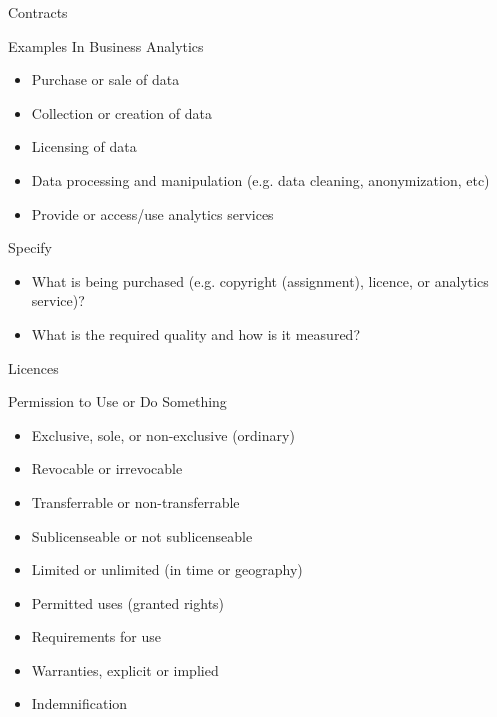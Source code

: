 \documentclass[ignorenonframetext,xcolor=x11names]{beamer}
\begin{document}
\begin{frame}{Contracts}
  \begin{block}{Examples In Business Analytics}
  \begin{itemize}
     \item Purchase or sale of data
     \item Collection or creation of data
     \item Licensing of data
     \item Data processing and manipulation (e.g. data cleaning, anonymization, etc)
     \item Provide or access/use analytics services
   \end{itemize}
   \end{block}
   \begin{block}{Specify}
   \begin{itemize}
      \item What is being purchased (e.g. copyright (assignment), licence, or analytics service)?
      \item What is the required quality and how is it measured?
   \end{itemize}
   \end{block}
\end{frame}

\begin{frame}{Licences}
  \begin{block}{Permission to Use or Do Something}
  \begin{itemize}
     \item Exclusive, sole, or non-exclusive (ordinary)
     \item Revocable or irrevocable
     \item Transferrable or non-transferrable
     \item Sublicenseable or not sublicenseable
     \item Limited or unlimited (in time or geography)
     \item Permitted uses (granted rights)
     \item Requirements for use
     \item Warranties, explicit or implied
     \item Indemnification
  \end{itemize}
  \end{block}
\end{frame}
\end{document}
